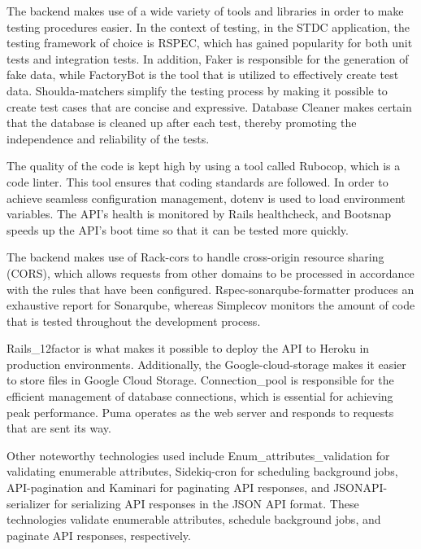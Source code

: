 \begin{justify}
    \vspace{0.25cm}
    \newendline The backend makes use of a wide variety of tools and libraries in order to make testing procedures easier. In the context of testing, in the STDC application, the testing framework of choice is RSPEC, which has gained popularity for both unit tests and integration tests. In addition,  Faker is responsible for the generation of fake data, while FactoryBot is the tool that is utilized to effectively create test data. Shoulda-matchers simplify the testing process by making it possible to create test cases that are concise and expressive. Database Cleaner makes certain that the database is cleaned up after each test, thereby promoting the independence and reliability of the tests.

    \vspace{0.25cm}
    \newendline The quality of the code is kept high by using a tool called Rubocop, which is a code linter. This tool ensures that coding standards are followed. In order to achieve seamless configuration management, dotenv is used to load environment variables. The API's health is monitored by Rails healthcheck, and Bootsnap speeds up the API's boot time so that it can be tested more quickly.

    \vspace{0.25cm}
    \newendline The backend makes use of Rack-cors to handle cross-origin resource sharing (CORS), which allows requests from other domains to be processed in accordance with the rules that have been configured. Rspec-sonarqube-formatter produces an exhaustive report for Sonarqube, whereas Simplecov monitors the amount of code that is tested throughout the development process.

    \vspace{0.25cm}
    \newendline Rails\_12factor is what makes it possible to deploy the API to Heroku in production environments. Additionally, the Google-cloud-storage makes it easier to store files in Google Cloud Storage. Connection\_pool is responsible for the efficient management of database connections, which is essential for achieving peak performance. Puma operates as the web server and responds to requests that are sent its way.
    
    \vspace{0.25cm}
    \newendline Other noteworthy technologies used include Enum\_attributes\_validation for validating enumerable attributes, Sidekiq-cron for scheduling background jobs, API-pagination and Kaminari for paginating API responses, and JSONAPI-serializer for serializing API responses in the JSON API format. These technologies validate enumerable attributes, schedule background jobs, and paginate API responses, respectively.


\end{justify}
